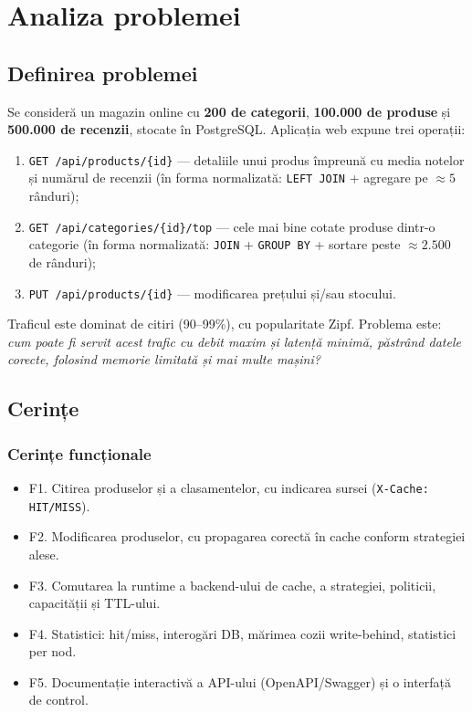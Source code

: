 \chapter{Analiza problemei}
\label{ch:analiza}

\section{Definirea problemei}

Se consideră un magazin online cu \textbf{200 de categorii}, \textbf{100.000 de produse} și
\textbf{500.000 de recenzii}, stocate în PostgreSQL. Aplicația web expune trei operații:

\begin{enumerate}
  \item \texttt{GET /api/products/\{id\}} — detaliile unui produs împreună cu media notelor și numărul de
        recenzii (în forma normalizată: \texttt{LEFT JOIN} + agregare pe $\approx 5$ rânduri);
  \item \texttt{GET /api/categories/\{id\}/top} — cele mai bine cotate produse dintr-o categorie
        (în forma normalizată: \texttt{JOIN} + \texttt{GROUP BY} + sortare peste $\approx 2.500$ de rânduri);
  \item \texttt{PUT /api/products/\{id\}} — modificarea prețului și/sau stocului.
\end{enumerate}

Traficul este dominat de citiri (90–99\%), cu popularitate Zipf. Problema este: \emph{cum poate fi
servit acest trafic cu debit maxim și latență minimă, păstrând datele corecte, folosind memorie
limitată și mai multe mașini?}

\section{Cerințe}

\subsection{Cerințe funcționale}
\begin{itemize}
  \item F1. Citirea produselor și a clasamentelor, cu indicarea sursei (\texttt{X-Cache: HIT/MISS}).
  \item F2. Modificarea produselor, cu propagarea corectă în cache conform strategiei alese.
  \item F3. Comutarea la runtime a backend-ului de cache, a strategiei, politicii, capacității și TTL-ului.
  \item F4. Statistici: hit/miss, interogări DB, mărimea cozii write-behind, statistici per nod.
  \item F5. Documentație interactivă a API-ului (OpenAPI/Swagger) și o interfață de control.
\end{itemize}

